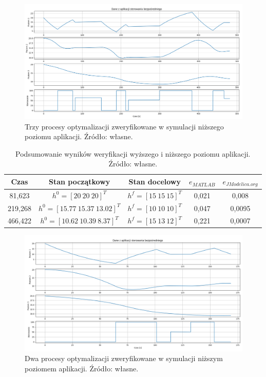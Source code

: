 \begin{figure}
    \centering
    \includegraphics[scale=0.5,angle=90]{Grafika/ext_ctrl_3_opts}
    \caption{Trzy procesy optymalizacji zweryfikowane w symulacji niższego poziomu aplikacji. Źródło: własne.}
    \label{fig:extctrl3opts}
\end{figure}


\begin{table}[htp]
    \centering
    \begin{tabular}{|c|c|c|c|c|}
        \hline 
        \textbf{Czas} & \textbf{Stan początkowy} & \textbf{Stan docelowy} & \textbf{$e_{MATLAB}$} & \textbf{$e_{JModelica.org}$} \\ 
        \hline 
        81,623 & $h^{0} = [20 ~20~ 20]^{T}$ & $h^{f} = [15 ~15~ 15]^{T}$ & 0,021 & 0,008 \\ 
        \hline 
        219,268 & $h^{0} = [15.77~ 15.37~ 13.02]^{T}$ & $h^{f} = [10 ~10~ 10]^{T}$ & 0,047 & 0,0095 \\ 
        \hline 
        466,422 & $h^{0} = [10.62~ 10.39~ 8.37]^{T}$ & $h^{f} = [15 ~13~ 12]^{T}$ & 0,221 & 0,0007 \\ 
        \hline 
    \end{tabular}
\caption{Podsumowanie wyników weryfikacji wyższego i niższego poziomu aplikacji. Źródło: własne.}
\label{tab:extctrl3opts}
\end{table}

\begin{figure}
    \centering
    \includegraphics[scale=0.5,angle=90]{Grafika/ext_ctrl_2_opts}
    \caption{Dwa procesy optymalizacji zweryfikowane w symulacji niższym poziomem aplikacji. Źródło: własne.}
    \label{fig:extctrl2opts}
\end{figure}

